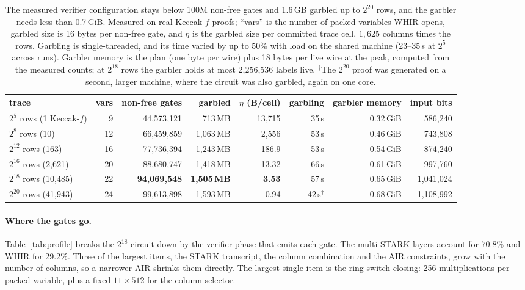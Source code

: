 \documentclass[11pt]{article}
\begin{document}
\begin{table}[t]\centering\footnotesize\setlength{\tabcolsep}{4pt}
\begin{tabular}{lrrrrrrr}\toprule
trace & vars & non-free gates & garbled & $\eta$ (B/cell) & garbling & garbler memory & input bits\\\midrule
$2^5$ rows (1 Keccak-$f$) & 9 & 44{,}573{,}121 & 713\,MB & 13{,}715 & 35\,s & 0.32\,GiB & 586{,}240\\
$2^8$ rows (10) & 12 & 66{,}459{,}859 & 1{,}063\,MB & 2{,}556 & 53\,s & 0.46\,GiB & 743{,}808\\
$2^{12}$ rows (163) & 16 & 77{,}736{,}394 & 1{,}243\,MB & 186.9 & 53\,s & 0.54\,GiB & 874{,}240\\
$2^{16}$ rows (2{,}621) & 20 & 88{,}680{,}747 & 1{,}418\,MB & 13.32 & 66\,s & 0.61\,GiB & 997{,}760\\
$2^{18}$ rows (10{,}485) & 22 & \textbf{94{,}069{,}548} & \textbf{1{,}505\,MB} & \textbf{3.53} & 57\,s & 0.65\,GiB & 1{,}041{,}024\\
$2^{20}$ rows (41{,}943) & 24 & 99{,}613{,}898 & 1{,}593\,MB & 0.94 & 42\,s$^{\dagger}$ & 0.68\,GiB & 1{,}108{,}992\\\bottomrule
\end{tabular}
\caption{The measured verifier configuration stays below 100M non-free gates
and 1.6\,GB garbled up to $2^{20}$ rows, and the garbler needs less than
0.7\,GiB. Measured on real
Keccak-$f$ proofs; ``vars'' is the number of packed variables WHIR opens,
garbled size is 16 bytes per non-free gate, and $\eta$ is the garbled size per
committed trace cell, $1{,}625$ columns times the rows. Garbling is single-threaded, and its
time varied by up to 50\% with load on the shared machine (23--35\,s at $2^5$
across runs). Garbler memory is the plan (one byte per wire) plus 18 bytes per
live wire at the peak, computed from the measured counts; at $2^{18}$ rows the
garbler holds at most 2{,}256{,}536 labels live. $^{\dagger}$The $2^{20}$ proof was
generated on a second, larger machine, where the circuit was also garbled, again
on one core.}
\label{tab:main}
\end{table}

\paragraph{Where the gates go.} Table~\ref{tab:profile} breaks the $2^{18}$
circuit down by the verifier phase that emits each gate. The multi-STARK layers
account for $70.8\%$ and WHIR for $29.2\%$. Three of the largest items, the STARK
transcript, the column combination and the AIR constraints, grow with the number
of columns, so a narrower AIR shrinks them directly. The largest single
item is the ring switch closing: 256 multiplications per packed variable, plus a
fixed $11\times512$ for the column selector.
\end{document}
